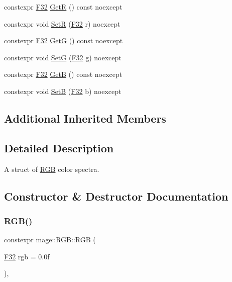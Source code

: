 \begin{DoxyCompactItemize}
\item 
constexpr \mbox{\hyperlink{namespacemage_aa97e833b45f06d60a0a9c4fc22ae02c0}{F32}} \mbox{\hyperlink{structmage_1_1_r_g_b_a314530cf81692c9f49da663ba51ea528}{GetR}} () const noexcept
\item 
constexpr void \mbox{\hyperlink{structmage_1_1_r_g_b_a1fc1a5b272202fb56f3a8f35735836d2}{SetR}} (\mbox{\hyperlink{namespacemage_aa97e833b45f06d60a0a9c4fc22ae02c0}{F32}} r) noexcept
\item 
constexpr \mbox{\hyperlink{namespacemage_aa97e833b45f06d60a0a9c4fc22ae02c0}{F32}} \mbox{\hyperlink{structmage_1_1_r_g_b_a997a18a9af34e5796d18974762574faf}{GetG}} () const noexcept
\item 
constexpr void \mbox{\hyperlink{structmage_1_1_r_g_b_a6a47f8186e29e29a9d253732e7071ed7}{SetG}} (\mbox{\hyperlink{namespacemage_aa97e833b45f06d60a0a9c4fc22ae02c0}{F32}} g) noexcept
\item 
constexpr \mbox{\hyperlink{namespacemage_aa97e833b45f06d60a0a9c4fc22ae02c0}{F32}} \mbox{\hyperlink{structmage_1_1_r_g_b_a5a48ef39436290969ed01021bdbb687d}{GetB}} () const noexcept
\item 
constexpr void \mbox{\hyperlink{structmage_1_1_r_g_b_a363d6235bc2c68907addb5326df07dc7}{SetB}} (\mbox{\hyperlink{namespacemage_aa97e833b45f06d60a0a9c4fc22ae02c0}{F32}} b) noexcept
\end{DoxyCompactItemize}
\subsection*{Additional Inherited Members}


\subsection{Detailed Description}
A struct of \mbox{\hyperlink{structmage_1_1_r_g_b}{R\+GB}} color spectra. 

\subsection{Constructor \& Destructor Documentation}
\mbox{\label{structmage_1_1_r_g_b_a166d2c13b46f9518c132c68f1117e5c6}} 
\subsubsection{\texorpdfstring{R\+G\+B()}{RGB()}\hspace{0.1cm}{\footnotesize\ttfamily [1/7]}}
{\footnotesize\ttfamily constexpr mage\+::\+R\+G\+B\+::\+R\+GB (\begin{DoxyParamCaption}\item[{\mbox{\hyperlink{namespacemage_aa97e833b45f06d60a0a9c4fc22ae02c0}{F32}}}]{rgb = {\ttfamily 0.0f} }\end{DoxyParamCaption})\hspace{0.3cm}{\ttfamily [explicit]}, {\ttfamily [noexcept]}}

